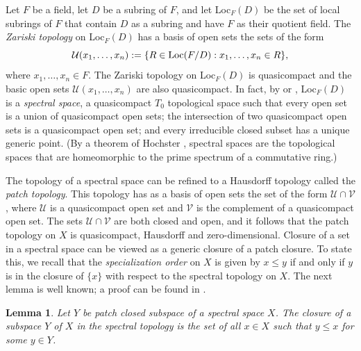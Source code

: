 \documentclass[preprint, 11pt,nonatbib]{elsarticle}
\newtheorem{lemma}[theorem]{Lemma}
\theoremstyle{definition}
\numberwithin{theorem}{section}
\begin{document}
Let $F$ be a field,  let $D$ be a subring of $F$, and let Loc$_F(D)$ be the set of local subrings of $F$ that contain $D$ as a subring and have $F$ as their quotient field. The {\it Zariski topology} on Loc$_F(D)$ has a basis of  open sets the sets of the form 
    $${\mathcal{U}}(x_1,\ldots,x_n):=\{R\in {\rm Loc}(F/D):x_1,\ldots,x_n \in R\},$$
where $x_1,\ldots,x_n\in F$.  
The Zariski topology on Loc$_F(D)$ is quasicompact and the basic open sets  ${\mathcal{U}}(x_1,\ldots,x_n)$ are also quasicompact. In fact, by  \cite[Corollary~2.14]{MR3565806} or \cite[Example~2.1(7)]{MR3565813}, Loc$_F(D)$ is  a {\it spectral space},    a quasicompact $T_0$ topological space such that every open set is a union of  quasicompact open sets; the intersection of two quasicompact open sets is a quasicompact open set; and every irreducible closed subset has a unique generic point.  
(By a theorem of Hochster \cite{MR251026}, spectral spaces are   the topological spaces that are homeomorphic to the prime spectrum of a commutative ring.)  %


The topology of a spectral space  can be refined to a Hausdorff topology called the {\it patch topology}. This topology has as a basis of open  sets the set of the form ${\mathcal{U}} \cap {\mathcal{V}}$, where ${\mathcal{U}}$ is a quasicompact open set  and ${\mathcal{V}}$ is the complement of a quasicompact open set. The sets ${\mathcal{U}} \cap {\mathcal{V}}$ are both closed and open, and it follows that the patch topology on $X$ is quasicompact, Hausdorff and zero-dimensional. 
Closure of a set in a spectral space can be viewed as a generic closure of a patch closure. To state this, we recall that the {\it specialization order} on $X$ is given by $x \leq y$ if and only if $y$ is in the closure of $\{x\}$ with respect to the spectral topology on $X$.  
The next lemma is well known; a proof can be found in 
\cite[
{Tag 0903}]{stacks-project}.

\begin{lemma}  \label{generic closure} Let $Y$ be patch closed subspace of a spectral space $X$. The closure of a subspace $Y$ of $X$ in the spectral topology is the set of all $x \in X$ such that $y \leq x$ for some $y \in Y$. %
%
\end{lemma}
 
\end{document}
